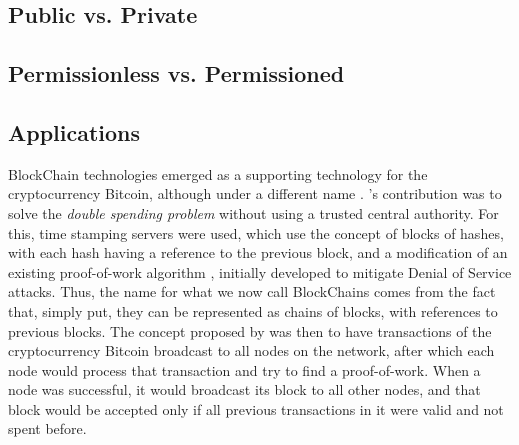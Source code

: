 \subsection{Public vs. Private}

\subsection{Permissionless vs. Permissioned}

\subsection{Applications}

BlockChain technologies emerged as a supporting technology for the cryptocurrency Bitcoin, although under a different name \cite{nakamoto_bitcoin:_2008}. \citeauthor{nakamoto_bitcoin:_2008}'s contribution was to solve the \textit{double spending problem} without using a trusted central authority. For this, time stamping servers were used, which use the concept of blocks of hashes, with each hash having a reference to the previous block, and a modification of an existing proof-of-work algorithm \cite{back_hashcash_2002}, initially developed to mitigate Denial of Service attacks. Thus, the name for what we now call BlockChains comes from the fact that, simply put, they can be represented as chains of blocks, with references to previous blocks. The concept proposed by \citeauthor{nakamoto_bitcoin:_2008} was then to have transactions of the cryptocurrency Bitcoin broadcast to all nodes on the network, after which each node would process that transaction and try to find a proof-of-work. When a node was successful, it would broadcast its block to all other nodes, and that block would be accepted only if all previous transactions in it were valid and not spent before.
  
